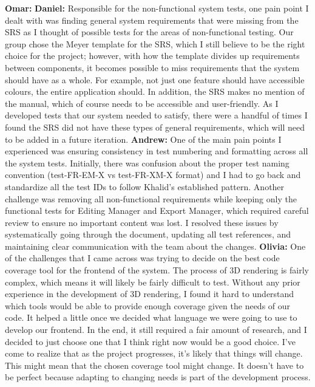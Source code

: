 \documentclass[12pt, titlepage]{article}
\begin{document}
\begin{enumerate}
\textbf{Omar: }
\newline
\newline
\textbf{Daniel: }Responsible for the non-functional system tests, one pain point I dealt with was finding general system requirements that were missing from the SRS as I thought of possible tests for the areas of non-functional testing. Our group chose the Meyer template for the SRS, which I still believe to be the right choice for the project; however, with how the template divides up requirements between components, it becomes possible to miss requirements that the system should have as a whole. For example, not just one feature should have accessible colours, the entire application should. In addition, the SRS makes no mention of the manual, which of course needs to be accessible and user-friendly. As I developed tests that our system needed to satisfy, there were a handful of times I found the SRS did not have these types of general requirements, which will need to be added in a future iteration. 
\newline
\newline
\textbf{Andrew: } One of the main pain points I experienced was ensuring consistency in test numbering and formatting across all the system tests. Initially, there was confusion about the proper test naming convention (test-FR-EM-X vs test-FR-XM-X format) and I had to go back and standardize all the test IDs to follow Khalid's established pattern. Another challenge was removing all non-functional requirements while keeping only the functional tests for Editing Manager and Export Manager, which required careful review to ensure no important content was lost. I resolved these issues by systematically going through the document, updating all test references, and maintaining clear communication with the team about the changes.
\newline
\newline
\textbf{Olivia: } One of the challenges that I came across was trying to decide on the best code coverage tool for the frontend of the system. The process of 3D rendering is fairly complex, which means it will likely be fairly difficult to test. Without any prior experience in the development of 3D rendering, I found it hard to understand which tools would be able to provide enough coverage given the needs of our code. It helped a little once we decided what language we were going to use to develop our frontend. In the end, it still required a fair amount of research, and I decided to just choose one that I think right now would be a good choice. I’ve come to realize that as the project progresses, it’s likely that things will change. This might mean that the chosen coverage tool might change. It doesn’t have to be perfect because adapting to changing needs is part of the development process.

\end{enumerate}
\end{document}
